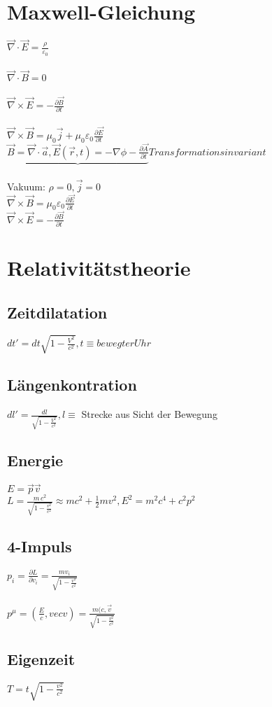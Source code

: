 \documentclass[10pt,a4paper]{article}
\begin{document}
\section{Maxwell-Gleichung}
$\vec\nabla\cdot\vec{E}= \frac{\rho}{\varepsilon_0}$\\
%
\\
$\vec\nabla\cdot\vec{B}=0$\\
%
\\
$\vec\nabla\times\vec{E}=-\frac{\partial\vec{B}}{\partial t}$\\
%
\\
$\vec\nabla\times\vec{B}= \mu_0\vec{j}+\mu_0\varepsilon_0\frac{\partial\vec{E}}{\partial t}$\\
%
$\underbrace{\vec{B}=\vec\nabla\cdot\vec{a},\vec{E}(\vec{r},t) = -\nabla\phi - \frac{\partial \vec{A}}{\partial t}}{Transformationsinvariant}$\\
%
\\
Vakuum: $\rho = 0, \vec{j}=0$\\
$\vec\nabla\times\vec{B}=\mu_0\varepsilon_0\frac{\partial\vec{E}}{\partial t}$\\
$\vec\nabla\times\vec{E}=-\frac{\partial\vec{B}}{\partial t}$\\


\section{Relativitätstheorie}
\subsection{Zeitdilatation}
$dt'=dt\sqrt{1-\frac{V^2}{c^2}}, t \equiv bewegter Uhr$\\
%
\subsection{Längenkontration}
$dl'= \frac{dl}{\sqrt{1-\frac{V^2}{c^2}}}, l \equiv$ Strecke aus Sicht der Bewegung\\
%
\subsection{Energie}
$E=\vec{p}\vec{v}$\\
$L=\frac{m \, c^2}{\sqrt{1-\frac{v^2}{c^2}}}\approx mc^2+\frac{1}{2}mv^2, E^2= m^2c^4+c^2p^2$\\
%
\subsection{4-Impuls}
$p_i=\frac{\partial L}{\partial v_i}= \frac{mv_i}{\sqrt{1-\frac{v^2}{c^2}}}$\\
%
\\
$p^\mu = (\frac{E}{c},vec{v})= \frac{m(c,\vec{v}}{\sqrt{1-\frac{v^2}{c^2}}}$\\
%
\subsection{Eigenzeit}
$T=t\sqrt{1-\frac{v^2}{c^2}}$
\end{document}
